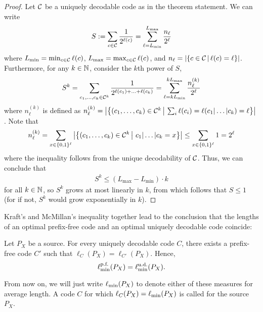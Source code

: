 \begin{proof}
Let ${\cal C}$ be a uniquely decodable code as in the theorem statement. We can write
\begin{align}
S := \sum_{c \in \cal C} \frac{1}{2^{\len(c)}} = \sum_{\ell = L_{\min}}^{L_{\max}} \frac{n_\ell}{2^\ell} 
\end{align}
where $L_{\min} = \min_{c \in \cal C} \len(c)$, $L_{\max} = \max_{c \in \cal C} \len(c)$, and $n_{\ell} = |\Set{c \in {\cal C}}{\len(c) = \ell}|$. Furthermore, for any $k \in \N$,  consider the $k$th power of $S$,
\begin{align}
S^k = \sum_{c_1,\ldots,c_k \in \mathcal{C}^k} \frac{1}{2^{\len(c_1)+\ldots+\len(c_k)}} = \sum_{\ell = k L_{\min}}^{k L_{\max}} \frac{n_\ell^{(k)}}{2^\ell} 
\end{align}
where $n_\ell^{(k)}$ is defined as $n_\ell^{(k)} = \big|\SET[\big]{(c_1,\ldots,c_k) \in {\cal C}^k}{\sum_i\len(c_i) = \len(c_1|\ldots|c_k) = \ell}\big|$. Note that
\begin{align}
n_\ell^{(k)} = \sum_{x \in \set{0,1}^{\ell}} \big|\SET{(c_1,\ldots,c_k) \in {\cal C}^k}{\,c_1|\ldots|c_k = x}\big| \leq \sum_{x \in \set{0,1}^{\ell}} 1 = 2^{\ell}
\end{align}
where the inequality follows from the unique decodability of $\cal C$. Thus, we can conclude that 
\begin{align}
S^k \leq (L_{\max} - L_{\min}) \cdot k 
\end{align}
for all $k \in \N$, so $S^k$ grows at most linearly in $k$, from which follows that $S \leq 1$ (for if not, $S^k$ would grow exponentially in $k$).
\end{proof}
Kraft's and McMillan's inequality together lead to the conclusion that the lengths of an optimal prefix-free code and an optimal uniquely decodable code coincide:
\begin{corollary}
Let $P_X$ be a source. For every uniquely decodable code $C$, there exists a prefix-free code $C'$ such that $\ell_C(P_X) = \ell_{C'}(P_X)$. Hence,
\[
\ell_{\min}^{\text{\rm p.f.}}(P_X) = \ell_{\min}^{\text{\rm u.d.}}(P_X).
\]
\end{corollary}
From now on, we will just write $\len_{\min}(P_X)$ to denote either of these measures for average length. A code $C$ for which $\len_C(P_X) = \len_{\min}(P_X)$ is called  for the source $P_X$. 




